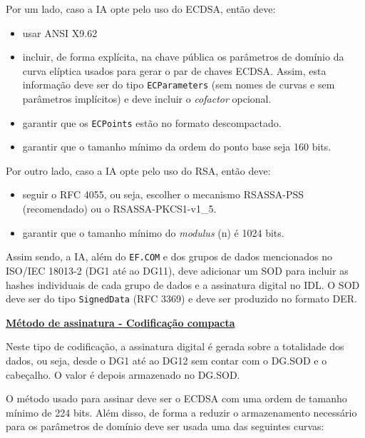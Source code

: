 Por um lado, caso a IA opte pelo uso do ECDSA, então deve:
\begin{itemize}
\item usar ANSI X9.62
\item incluir, de forma explícita, na chave pública os parâmetros de domínio da
curva elíptica usados para gerar o par de chaves ECDSA. Assim, esta
informação deve ser do tipo \texttt{ECParameters} (sem nomes de curvas e sem
parâmetros implícitos) e deve incluir o \emph{cofactor} opcional.
\item garantir que os \texttt{ECPoints} estão no formato descompactado.
\item garantir que o tamanho mínimo da ordem do ponto base seja 160 bits.
\end{itemize}

Por outro lado, caso a IA opte pelo uso do RSA, então deve:
\begin{itemize}
\item seguir o RFC 4055, ou seja, escolher o mecanismo RSASSA-PSS (recomendado)
ou o RSASSA-PKCS1-v1\_5.
\item garantir que o tamanho mínimo do \emph{modulus} (n) é 1024 bits.
\end{itemize}

Assim sendo, a IA, além do \texttt{EF.COM} e dos grupos de dados mencionados no
ISO/IEC 18013-2 (DG1 até ao DG11), deve adicionar um SOD para incluir
as hashes individuais de cada grupo de dados e a assinatura digital no IDL.
O SOD deve ser do tipo \texttt{SignedData} (RFC 3369) e deve ser produzido no
formato DER.


\vspace{0.6cm}
\underline{\textbf{Método de assinatura - Codificação compacta}}
\vspace{0.3cm}

Neste tipo de codificação, a assinatura digital é gerada sobre a
totalidade dos dados, ou seja, desde o DG1 até ao DG12 sem contar com o
DG.SOD e o cabeçalho. O valor é depois armazenado no DG.SOD.

O método usado para assinar deve ser o ECDSA com uma ordem de tamanho
mínimo de 224 bits. Além disso, de forma a reduzir o armazenamento
necessário para os parâmetros de domínio deve ser usada uma das seguintes
curvas:


